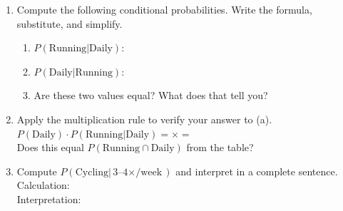 \documentclass[10pt]{article}
\begin{document}
\begin{tcolorbox}[colback=sky, colframe=navy, boxrule=0.9pt, arc=2mm,
    left=3mm, right=3mm, top=2mm, bottom=2mm,
    title={\bfseries\small Tier A --- Approaching Proficiency: Calculate, Apply, and Interpret},
    fonttitle=\small]
\small
\begin{enumerate}[leftmargin=1.5em, itemsep=10pt]
  \item Compute the following conditional probabilities. Write the formula, substitute, and simplify.
        \begin{enumerate}[label=(\alph*), itemsep=6pt]
          \item $P(\text{Running} | \text{Daily})$: \blank{8cm}
          \item $P(\text{Daily} | \text{Running})$: \blank{8cm}
          \item Are these two values equal? What does that tell you? \writeline\writeline
        \end{enumerate}

  \item Apply the multiplication rule to verify your answer to (a).\\
        $P(\text{Daily}) \cdot P(\text{Running}|\text{Daily}) = $\blank{3cm}$\times$\blank{3cm}$ = $\blank{3cm}\\
        Does this equal $P(\text{Running} \cap \text{Daily})$ from the table? \blank{2cm}

  \item Compute $P(\text{Cycling} | \text{3--4$\times$/week})$ and interpret in a complete sentence.\\
        Calculation: \blank{6cm}\\
        Interpretation: \writeline\writeline
\end{enumerate}
\end{tcolorbox}

\vspace{0.1in}
\end{document}

